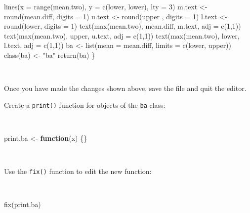 \documentclass[
  12pt,
  a4paper]{book}
\newenvironment{Shaded}{\begin{snugshade}}{\end{snugshade}}
\newcommand{\AttributeTok}[1]{\textcolor[rgb]{0.77,0.63,0.00}{#1}}
\newcommand{\ControlFlowTok}[1]{\textcolor[rgb]{0.13,0.29,0.53}{\textbf{#1}}}
\newcommand{\DecValTok}[1]{\textcolor[rgb]{0.00,0.00,0.81}{#1}}
\newcommand{\FunctionTok}[1]{\textcolor[rgb]{0.00,0.00,0.00}{#1}}
\newcommand{\NormalTok}[1]{#1}
\newcommand{\OtherTok}[1]{\textcolor[rgb]{0.56,0.35,0.01}{#1}}
\newcommand{\StringTok}[1]{\textcolor[rgb]{0.31,0.60,0.02}{#1}}
\begin{document}
\begin{Shaded}
\begin{Highlighting}[]
  \FunctionTok{lines}\NormalTok{(}\AttributeTok{x =} \FunctionTok{range}\NormalTok{(mean.two), }\AttributeTok{y =} \FunctionTok{c}\NormalTok{(lower, lower), }\AttributeTok{lty =} \DecValTok{3}\NormalTok{)}
\NormalTok{  m.text }\OtherTok{\textless{}{-}} \FunctionTok{round}\NormalTok{(mean.diff, }\AttributeTok{digits =} \DecValTok{1}\NormalTok{)}
\NormalTok{  u.text }\OtherTok{\textless{}{-}} \FunctionTok{round}\NormalTok{(upper , }\AttributeTok{digits =} \DecValTok{1}\NormalTok{)}
\NormalTok{  l.text }\OtherTok{\textless{}{-}} \FunctionTok{round}\NormalTok{(lower, }\AttributeTok{digits =} \DecValTok{1}\NormalTok{)}
  \FunctionTok{text}\NormalTok{(}\FunctionTok{max}\NormalTok{(mean.two), mean.diff, m.text, }\AttributeTok{adj =} \FunctionTok{c}\NormalTok{(}\DecValTok{1}\NormalTok{,}\DecValTok{1}\NormalTok{)) }
  \FunctionTok{text}\NormalTok{(}\FunctionTok{max}\NormalTok{(mean.two), upper, u.text, }\AttributeTok{adj =} \FunctionTok{c}\NormalTok{(}\DecValTok{1}\NormalTok{,}\DecValTok{1}\NormalTok{)) }
  \FunctionTok{text}\NormalTok{(}\FunctionTok{max}\NormalTok{(mean.two), lower, l.text, }\AttributeTok{adj =} \FunctionTok{c}\NormalTok{(}\DecValTok{1}\NormalTok{,}\DecValTok{1}\NormalTok{))}
\NormalTok{  ba }\OtherTok{\textless{}{-}} \FunctionTok{list}\NormalTok{(}\AttributeTok{mean =}\NormalTok{ mean.diff, }\AttributeTok{limits =} \FunctionTok{c}\NormalTok{(lower, upper))}
  \FunctionTok{class}\NormalTok{(ba) }\OtherTok{\textless{}{-}} \StringTok{"ba"}
  \FunctionTok{return}\NormalTok{(ba)}
\NormalTok{\}}
\end{Highlighting}
\end{Shaded}

~

Once you have made the changes shown above, save the file and quit the editor.

Create a \texttt{print()} function for objects of the \texttt{ba} class:

~

\begin{Shaded}
\begin{Highlighting}[]
\NormalTok{print.ba }\OtherTok{\textless{}{-}} \ControlFlowTok{function}\NormalTok{(x) \{\}}
\end{Highlighting}
\end{Shaded}

~

Use the \texttt{fix()} function to edit the new function:

~

\begin{Shaded}
\begin{Highlighting}[]
\FunctionTok{fix}\NormalTok{(print.ba)}
\end{Highlighting}
\end{Shaded}
\end{document}
